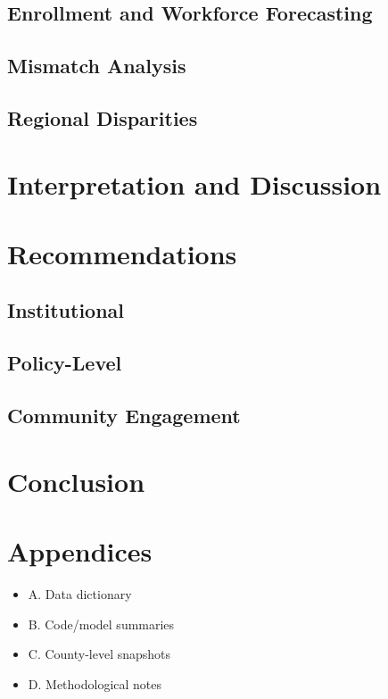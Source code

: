 \documentclass[12pt]{llncs}
\begin{document}
\subsection{Enrollment and Workforce Forecasting}

\subsection{Mismatch Analysis}

\subsection{Regional Disparities}


\section{Interpretation and Discussion}


\section{Recommendations}
\subsection{Institutional}

\subsection{Policy-Level}

\subsection{Community Engagement}


\section{Conclusion}


\section{Appendices}
\begin{itemize}
  \item A. Data dictionary
  \item B. Code/model summaries
  \item C. County-level snapshots
  \item D. Methodological notes
\end{itemize}
\end{document}
